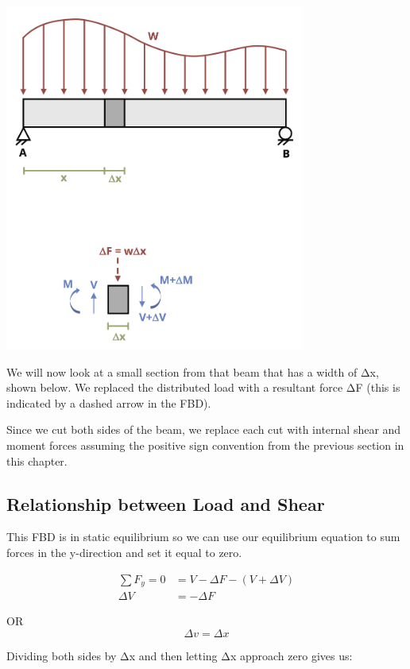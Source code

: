 \documentclass[
  letterpaper,
  DIV=11,
  numbers=noendperiod]{scrreprt}
\begin{document}
\begin{center}
\includegraphics[width=3.875in,height=\textheight]{images/CH7 PNGs/figure 7.4.png}
\end{center}

We will now look at a small section from that beam that has a width of
Δx, shown below. We replaced the distributed load with a resultant force
ΔF (this is indicated by a dashed arrow in the FBD).

Since we cut both sides of the beam, we replace each cut with internal
shear and moment forces assuming the positive sign convention from the
previous section in this chapter.

\subsection{Relationship between Load and
Shear}\label{relationship-between-load-and-shear}

This FBD is in static equilibrium so we can use our equilibrium equation
to sum forces in the y-direction and set it equal to zero.

\[
\begin{aligned}
\sum F_y=0 & =V-\Delta F-(V+\Delta V) \\
\Delta V & =-\Delta F
\end{aligned}
\]

OR \[
\Delta v=\Delta x
\]

Dividing both sides by Δx and then letting Δx approach zero gives us:
\end{document}

